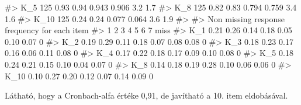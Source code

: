 \documentclass[
  letterpaper,
]{krantz}
\makeatletter
\newenvironment{Shaded}{\begin{snugshade}}{\end{snugshade}}
\newcommand{\CommentTok}[1]{\textcolor[rgb]{0.37,0.37,0.37}{#1}}
\newenvironment{kframe}{%
\medskip{}
\setlength{\fboxsep}{.8em}
 \def\at@end@of@kframe{}%
 \ifinner\ifhmode%
  \def\at@end@of@kframe{\end{minipage}}%
  \begin{minipage}{\columnwidth}%
 \fi\fi%
 \def\FrameCommand##1{\hskip\@totalleftmargin \hskip-\fboxsep
 \colorbox{shadecolor}{##1}\hskip-\fboxsep
     \hskip-\linewidth \hskip-\@totalleftmargin \hskip\columnwidth}%
 \MakeFramed {\advance\hsize-\width
   \@totalleftmargin\z@ \linewidth\hsize
   \@setminipage}}%
 {\par\unskip\endMakeFramed%
 \at@end@of@kframe}
\renewenvironment{Shaded}{\begin{kframe}}{\end{kframe}}
\makeatother
\begin{document}
\begin{Shaded}
\begin{Highlighting}[]
\CommentTok{\#\textgreater{} K\_5  125  0.93  0.94 0.943  0.906  3.2 1.7}
\CommentTok{\#\textgreater{} K\_8  125  0.82  0.83 0.794  0.759  3.4 1.6}
\CommentTok{\#\textgreater{} K\_10 125  0.24  0.24 0.077  0.064  3.6 1.9}
\CommentTok{\#\textgreater{} }
\CommentTok{\#\textgreater{} Non missing response frequency for each item}
\CommentTok{\#\textgreater{}         1    2    3    4    5    6    7 miss}
\CommentTok{\#\textgreater{} K\_1  0.21 0.26 0.14 0.18 0.05 0.10 0.07    0}
\CommentTok{\#\textgreater{} K\_2  0.19 0.29 0.11 0.18 0.07 0.08 0.08    0}
\CommentTok{\#\textgreater{} K\_3  0.18 0.23 0.17 0.16 0.06 0.11 0.08    0}
\CommentTok{\#\textgreater{} K\_4  0.17 0.22 0.18 0.17 0.09 0.10 0.08    0}
\CommentTok{\#\textgreater{} K\_5  0.18 0.24 0.21 0.15 0.10 0.04 0.07    0}
\CommentTok{\#\textgreater{} K\_8  0.14 0.18 0.19 0.28 0.10 0.06 0.06    0}
\CommentTok{\#\textgreater{} K\_10 0.10 0.27 0.20 0.12 0.07 0.14 0.09    0}
\end{Highlighting}
\end{Shaded}

Látható, hogy a Cronbach-alfa értéke 0,91, de javítható a 10. item
eldobásával.
\end{document}
